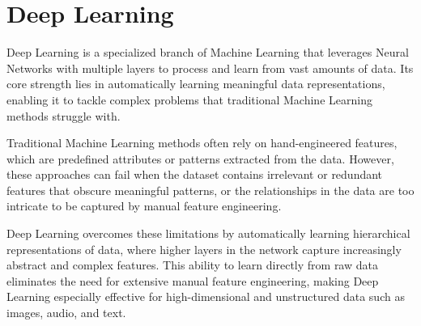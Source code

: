 \section{Deep Learning}

Deep Learning is a specialized branch of Machine Learning that leverages Neural Networks with multiple layers to process and learn from vast amounts of data. 
Its core strength lies in automatically learning meaningful data representations, enabling it to tackle complex problems that traditional Machine Learning methods struggle with.

Traditional Machine Learning methods often rely on hand-engineered features, which are predefined attributes or patterns extracted from the data. 
However, these approaches can fail when the dataset contains irrelevant or redundant features that obscure meaningful patterns, or the relationships in the data are too intricate to be captured by manual feature engineering.

Deep Learning overcomes these limitations by automatically learning hierarchical representations of data, where higher layers in the network capture increasingly abstract and complex features.
This ability to learn directly from raw data eliminates the need for extensive manual feature engineering, making Deep Learning especially effective for high-dimensional and unstructured data such as images, audio, and text.